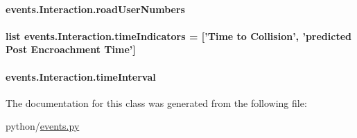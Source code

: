 \hypertarget{classevents_1_1Interaction_a9b1791b28fc1fce202bcd20ae43165cd}{
\paragraph[{road\-User\-Numbers}]{\setlength{\rightskip}{0pt plus 5cm}events.\-Interaction.\-road\-User\-Numbers}}\label{classevents_1_1Interaction_a9b1791b28fc1fce202bcd20ae43165cd}
\hypertarget{classevents_1_1Interaction_a4925b91d8a26d5f6e6e7e488009ed5ad}{
\paragraph[{time\-Indicators}]{\setlength{\rightskip}{0pt plus 5cm}list events.\-Interaction.\-time\-Indicators = \mbox{[}'Time to Collision', 'predicted Post Encroachment Time'\mbox{]}\hspace{0.3cm}{\ttfamily [static]}}}\label{classevents_1_1Interaction_a4925b91d8a26d5f6e6e7e488009ed5ad}
\hypertarget{classevents_1_1Interaction_acd9ac2aa2b8a71bb1718a3ee5899018b}{
\paragraph[{time\-Interval}]{\setlength{\rightskip}{0pt plus 5cm}events.\-Interaction.\-time\-Interval}}\label{classevents_1_1Interaction_acd9ac2aa2b8a71bb1718a3ee5899018b}


The documentation for this class was generated from the following file\-:\begin{DoxyCompactItemize}
\item 
python/\hyperlink{events_8py}{events.\-py}\end{DoxyCompactItemize}
